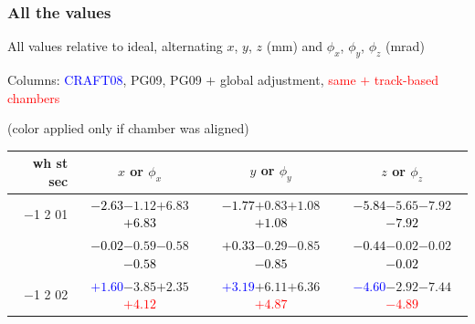 \documentclass[compress]{beamer}
\begin{document}
\begin{frame}
\frametitle{All the values}
\tiny

All values relative to ideal, alternating $x$, $y$, $z$ (mm) and $\phi_x$, $\phi_y$, $\phi_z$ (mrad)

Columns: \textcolor{blue}{CRAFT08}, PG09, PG09 $+$ global adjustment, \textcolor{red}{same $+$ track-based chambers}

\hfill (color applied only if chamber was aligned)

\vfill
\renewcommand{\arraystretch}{1.1}
\begin{tabular}{r | c | c | c}
wh st sec & $x$ or $\phi_x$ & $y$ or $\phi_y$ & $z$ or $\phi_z$ \\\hline
$-$1 2 01 & \textcolor{black}{$-2.63$}\hspace{0.1 cm}$-1.12$\hspace{0.1 cm}$+6.83$\hspace{0.1 cm}\textcolor{black}{$+6.83$} & \textcolor{black}{$-1.77$}\hspace{0.1 cm}$+0.83$\hspace{0.1 cm}$+1.08$\hspace{0.1 cm}\textcolor{black}{$+1.08$} & \textcolor{black}{$-5.84$}\hspace{0.1 cm}$-5.65$\hspace{0.1 cm}$-7.92$\hspace{0.1 cm}\textcolor{black}{$-7.92$} \\
          & \textcolor{black}{$-0.02$}\hspace{0.1 cm}$-0.59$\hspace{0.1 cm}$-0.58$\hspace{0.1 cm}\textcolor{black}{$-0.58$} & \textcolor{black}{$+0.33$}\hspace{0.1 cm}$-0.29$\hspace{0.1 cm}$-0.85$\hspace{0.1 cm}\textcolor{black}{$-0.85$} & \textcolor{black}{$-0.44$}\hspace{0.1 cm}$-0.02$\hspace{0.1 cm}$-0.02$\hspace{0.1 cm}\textcolor{black}{$-0.02$} \\
$-$1 2 02 & \textcolor{blue}{$+1.60$}\hspace{0.1 cm}$-3.85$\hspace{0.1 cm}$+2.35$\hspace{0.1 cm}\textcolor{red}{$+4.12$} & \textcolor{blue}{$+3.19$}\hspace{0.1 cm}$+6.11$\hspace{0.1 cm}$+6.36$\hspace{0.1 cm}\textcolor{red}{$+4.87$} & \textcolor{blue}{$-4.60$}\hspace{0.1 cm}$-2.92$\hspace{0.1 cm}$-7.44$\hspace{0.1 cm}\textcolor{red}{$-4.89$} \\

\end{tabular}
\end{frame}
\end{document}
